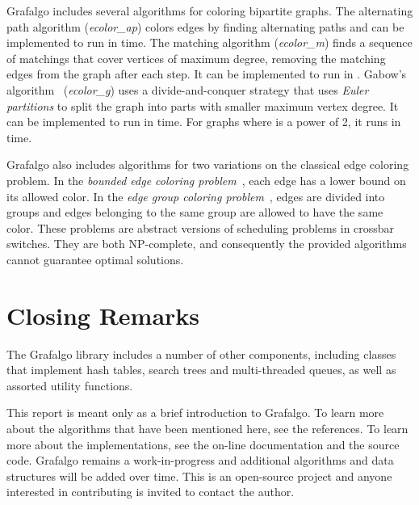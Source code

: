 \documentclass[11pt]{article}
\begin{document}
Grafalgo includes several algorithms for coloring bipartite graphs.
The alternating path algorithm ({\sl ecolor\_ap}) colors edges by finding alternating paths and can be 
implemented to run in  time.
The matching algorithm ({\sl ecolor\_m}) finds a sequence of matchings that cover vertices of maximum degree,
removing the matching edges from the graph after each step. It can be implemented to run
in .
Gabow's algorithm~\cite{GA76} ({\sl ecolor\_g}) uses a divide-and-conquer strategy that uses 
{\sl Euler partitions} to split the
graph into parts with smaller maximum vertex degree. It can be implemented to run in 
 time. For graphs where  is a power of 2, it runs in 
 time.

Grafalgo also includes algorithms for two variations on the classical edge coloring problem.
In the {\sl bounded edge coloring problem}~\cite{turner-2015c}, each edge has a lower bound on its allowed color.
In the {\sl edge group coloring problem}~\cite{turner-2015a}, edges are divided into groups and edges belonging 
to the same group are allowed to have the same color.
These problems are abstract versions of scheduling problems in crossbar switches.
They are both NP-complete, and consequently the provided algorithms cannot guarantee optimal solutions.

\section{Closing Remarks}

The Grafalgo library includes a number of other components, including
classes that implement hash tables, search trees and multi-threaded queues,
as well as assorted utility functions.

This report is meant only as a brief introduction to Grafalgo.
To learn more about the algorithms that have been mentioned here, see the references.
To learn more about the implementations, see the on-line documentation and the source code.
Grafalgo remains a work-in-progress and additional algorithms and data structures will be added over time.
This is an open-source project and anyone interested in contributing is invited to contact the author.
\end{document}
